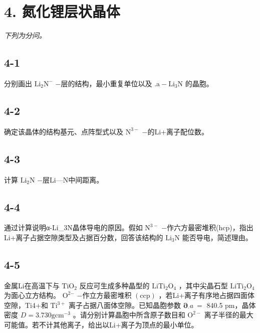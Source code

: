 \section*{4. 氮化锂层状晶体}
\textit{下列为分问。}

\subsection*{4-1}
分别画出 $\mathrm { L i _ { 2 } N ^ { - } }$ −层的结构，最⼩重复单位以及 $\mathrm { . } \mathrm { a - L i _ { 3 } N }$ 的晶胞。

\subsection*{4-2}
确定该晶体的结构基元、点阵型式以及 $\mathrm { N ^ { 3 - } }$ −的Li+离⼦配位数。

\subsection*{4-3}
计算 $\mathrm { L i _ { 2 } N }$ −层Li—N中间距离。

\subsection*{4-4}
通过计算说明α-Li_{3}N晶体导电的原因。假如 $\mathrm { N ^ { 3 - } }$ −作六⽅最密堆积(hcp)，指出Li+离⼦占据空隙类型及占据百分数，回答该结构的 $\mathrm { L i _ { 3 } N }$ 能否导电，简述理由。

\subsection*{4-5}
⾦属Li在⾼温下与 $\mathrm { T i O _ { 2 } }$ 反应可⽣成多种晶型的 $\mathrm { L i T i _ { 2 } O _ { 4 } }$ ，其中尖晶⽯型 $\mathrm { L i T i _ { 2 } O _ { 4 } }$ 为⾯⼼⽴⽅结构。 $\mathrm { O ^ { 2 \mathrm { - } } }$ −作⽴⽅最密堆积 $\left( \mathrm { c c p } \right)$ ，若Li+离⼦有序地占据四⾯体空隙，Ti4+和 $\mathrm { T i ^ { 3 + } }$ 离⼦占据⼋⾯体空隙。已知晶胞参数 $\mathbf { \partial } _ { \cdot } a \mathbf { \ } =$ 840.5 pm，晶体密度 $D = 3 . 7 3 0 \mathrm { g c m ^ { - 3 } }$ 。请分别计算晶胞中所含原⼦数⽬和 $\mathrm { O ^ { 2 - } }$ 离⼦半径的最⼤可能值。若不计其他离⼦，给出以Li+离⼦为顶点的最⼩单位。
